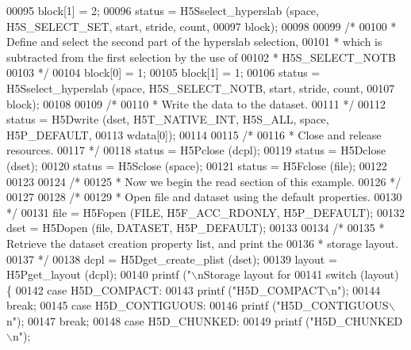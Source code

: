 \begin{DoxyCode}
{00095     block[1] = 2;
00096     status = H5Sselect\_hyperslab (space, H5S\_SELECT\_SET, start, stride, count,
00097                 block);
00098 
00099     \textcolor{comment}{/*}
00100 \textcolor{comment}{     * Define and select the second part of the hyperslab selection,}
00101 \textcolor{comment}{     * which is subtracted from the first selection by the use of}
00102 \textcolor{comment}{     * H5S\_SELECT\_NOTB}
00103 \textcolor{comment}{     */}
00104     block[0] = 1;
00105     block[1] = 1;
00106     status = H5Sselect\_hyperslab (space, H5S\_SELECT\_NOTB, start, stride, count,
00107                 block);
00108 
00109     \textcolor{comment}{/*}
00110 \textcolor{comment}{     * Write the data to the dataset.}
00111 \textcolor{comment}{     */}
00112     status = H5Dwrite (dset, H5T\_NATIVE\_INT, H5S\_ALL, space, H5P\_DEFAULT,
00113                 wdata[0]);
00114 
00115     \textcolor{comment}{/*}
00116 \textcolor{comment}{     * Close and release resources.}
00117 \textcolor{comment}{     */}
00118     status = H5Pclose (dcpl);
00119     status = H5Dclose (dset);
00120     status = H5Sclose (space);
00121     status = H5Fclose (file);
00122 
00123 
00124     \textcolor{comment}{/*}
00125 \textcolor{comment}{     * Now we begin the read section of this example.}
00126 \textcolor{comment}{     */}
00127 
00128     \textcolor{comment}{/*}
00129 \textcolor{comment}{     * Open file and dataset using the default properties.}
00130 \textcolor{comment}{     */}
00131     file = H5Fopen (FILE, H5F\_ACC\_RDONLY, H5P\_DEFAULT);
00132     dset = H5Dopen (file, DATASET, H5P\_DEFAULT);
00133 
00134     \textcolor{comment}{/*}
00135 \textcolor{comment}{     * Retrieve the dataset creation property list, and print the}
00136 \textcolor{comment}{     * storage layout.}
00137 \textcolor{comment}{     */}
00138     dcpl = H5Dget\_create\_plist (dset);
00139     layout = H5Pget\_layout (dcpl);
00140     printf (\textcolor{stringliteral}{"\(\backslash\)nStorage layout for %
00141     \textcolor{keywordflow}{switch} (layout) \{
00142         \textcolor{keywordflow}{case} H5D\_COMPACT:
00143             printf (\textcolor{stringliteral}{"H5D\_COMPACT\(\backslash\)n"});
00144             \textcolor{keywordflow}{break};
00145         \textcolor{keywordflow}{case} H5D\_CONTIGUOUS:
00146             printf (\textcolor{stringliteral}{"H5D\_CONTIGUOUS\(\backslash\)n"});
00147             \textcolor{keywordflow}{break};
00148         \textcolor{keywordflow}{case} H5D\_CHUNKED:
00149             printf (\textcolor{stringliteral}{"H5D\_CHUNKED\(\backslash\)n"});
}}
\end{DoxyCode}

